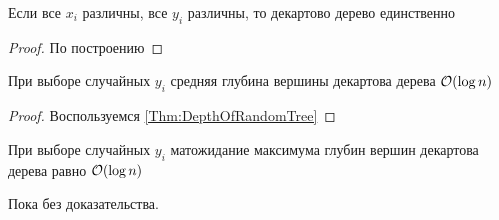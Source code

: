 



\begin{Thm}{Если все $x_i$ различны, все $y_i$ различны, то декартово дерево единственно}
\begin{proof}
  По построению
\end{proof}
\end{Thm}

\begin{Thm}{При выборе случайных $y_i$ средняя глубина вершины декартова дерева $\mathcal{O}(\log n)$}
\begin{proof}
  Воспользуемся \autoref{Thm:DepthOfRandomTree}
\end{proof}
\end{Thm}

\begin{Thm}{При выборе случайных $y_i$ матожидание максимума глубин вершин декартова дерева равно $\mathcal{O}(\log n)$}

Пока без доказательства.
\end{Thm}

